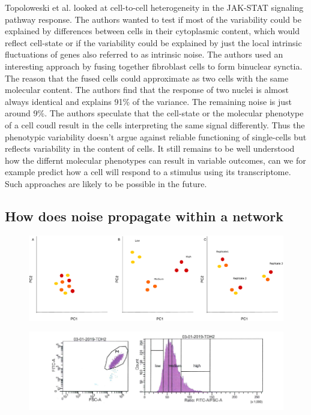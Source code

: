 Topoloweski et al. \cite{Topolweski} looked at cell-to-cell heterogeneity in the JAK-STAT signaling pathway response. The authors wanted to test if most of the variability could be explained by differences between cells in their cytoplasmic content, which would reflect cell-state or if the variability could be explained by just the local intrinsic fluctuations of genes also referred to as intrinsic noise. The authors used an interesting approach by fusing together fibroblast cells to form binuclear synctia. The reason that the fused cells could approximate as two cells with the same molecular content. The authors find that the response of two nuclei is almost always identical and explains 91\% of the variance. The remaining noise is just around 9\%. The authors speculate that the cell-state or the molecular phenotype of a cell coudl result in the cells interpreting the same signal differently. Thus the phenotypic variability doesn't argue against reliable functioning of single-cells but reflects variability in the content of cells. It still remains to be well understood how the differnt molecular phenotypes can result in variable outcomes, can we for example predict how a cell will respond to a stimulus using its transcriptome. Such approaches are likely to be possible in the future.

\subsection{ How does noise propagate within a network}

\begin{figure}[t!]  
    \centering
    \includegraphics[width=\linewidth, scale=0.5]{figures/intro/intro_clustering_expectedresults.pdf}
    \caption[]{%
        \textbf{}
    }
    \label{fig:aim1_task1}
\end{figure}



\begin{figure}[t!]  
    \centering
    \includegraphics[width=\linewidth]{figures/intro/intro_tdh2_facs.png}
    \caption[]{%
        \textbf{}
    }
    \label{fig:tdh2_pca}
\end{figure}


